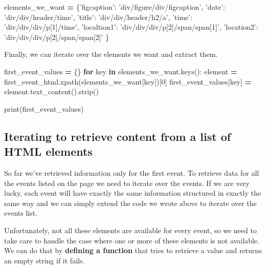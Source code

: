 \documentclass[]{book}
\newenvironment{Shaded}{\begin{snugshade}}{\end{snugshade}}
\newcommand{\KeywordTok}[1]{\textcolor[rgb]{0.13,0.29,0.53}{\textbf{#1}}}
\newcommand{\DecValTok}[1]{\textcolor[rgb]{0.00,0.00,0.81}{#1}}
\newcommand{\StringTok}[1]{\textcolor[rgb]{0.31,0.60,0.02}{#1}}
\newcommand{\ControlFlowTok}[1]{\textcolor[rgb]{0.13,0.29,0.53}{\textbf{#1}}}
\newcommand{\OperatorTok}[1]{\textcolor[rgb]{0.81,0.36,0.00}{\textbf{#1}}}
\newcommand{\BuiltInTok}[1]{#1}
\newcommand{\NormalTok}[1]{#1}
\begin{document}
\begin{Shaded}
\begin{Highlighting}[]
\NormalTok{elements_we_want }\OperatorTok{=}\NormalTok{ \{}\StringTok{'figcaption'}\NormalTok{: }\StringTok{'div/figure/div/figcaption'}\NormalTok{,}
                    \StringTok{'date'}\NormalTok{: }\StringTok{'div/div/header/time'}\NormalTok{,}
                    \StringTok{'title'}\NormalTok{: }\StringTok{'div/div/header/h2/a'}\NormalTok{,}
                    \StringTok{'time'}\NormalTok{: }\StringTok{'div/div/div/p[1]/time'}\NormalTok{,}
                    \StringTok{'localtion1'}\NormalTok{: }\StringTok{'div/div/div/p[2]/span/span[1]'}\NormalTok{,}
                    \StringTok{'location2'}\NormalTok{: }\StringTok{'div/div/div/p[2]/span/span[2]'}
\NormalTok{                    \}}
\end{Highlighting}
\end{Shaded}

Finally, we can iterate over the elements we want and extract them.

\begin{Shaded}
\begin{Highlighting}[]
\NormalTok{first_event_values }\OperatorTok{=}\NormalTok{ \{\}}
\ControlFlowTok{for}\NormalTok{ key }\KeywordTok{in}\NormalTok{ elements_we_want.keys():}
\NormalTok{    element }\OperatorTok{=}\NormalTok{ first_event_html.xpath(elements_we_want[key])[}\DecValTok{0}\NormalTok{]}
\NormalTok{    first_event_values[key] }\OperatorTok{=}\NormalTok{ element.text_content().strip()}

\BuiltInTok{print}\NormalTok{(first_event_values)}
\end{Highlighting}
\end{Shaded}

\subsection{Iterating to retrieve content from a list of HTML
elements}\label{iterating-to-retrieve-content-from-a-list-of-html-elements}

So far we've retrieved information only for the first event. To retrieve
data for all the events listed on the page we need to iterate over the
events. If we are very lucky, each event will have exactly the same
information structured in exactly the same way and we can simply extend
the code we wrote above to iterate over the events list.

Unfortunately, not all these elements are available for every event, so
we need to take care to handle the case where one or more of these
elements is not available. We can do that by \textbf{defining a
function} that tries to retrieve a value and returns an empty string if
it fails.
\end{document}
